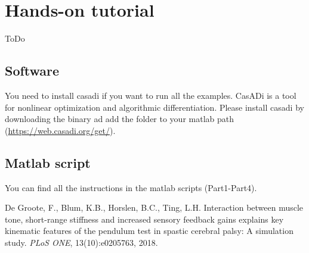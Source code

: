 \documentclass[
a4paper, %
11pt, %
onecolumn, %
openright, %
]{memoir}
\begin{document}
\chapter{Hands-on tutorial}

ToDo


\section{Software}
You need to install casadi if you want to run all the examples. CasADi is a tool for nonlinear optimization and algorithmic differentiation. Please install casadi by downloading the binary ad add the folder to your matlab path (\url{https://web.casadi.org/get/}).

\section{Matlab script}

You can find all the instructions in the matlab scripts (Part1-Part4).






\begin{thebibliography}{9}
De Groote, F., Blum, K.B., Horslen, B.C., Ting, L.H. Interaction between muscle tone, short-range stiffness and increased sensory feedback gains explains key kinematic features of the pendulum test in spastic cerebral palsy: A simulation study. 
\textit{PLoS ONE}, 13(10):e0205763, 2018. 
\end{thebibliography}
\end{document}
